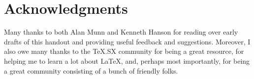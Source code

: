 
\section{Acknowledgments}
\label{sec:acknowledgments}

Many thanks to both Alan Munn and Kenneth Hanson for reading over early drafts of this handout and providing useful feedback and suggestions.
Moreover, I also owe many thanks to the TeX.SX community for being a great resource, for helping me to learn a lot about \LaTeX, and, perhaps most importantly, for being a great community consisting of a bunch of friendly folks.